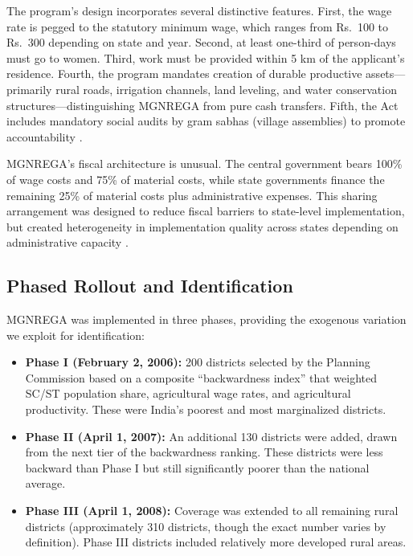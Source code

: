 \documentclass[12pt]{article}
\begin{document}
The program's design incorporates several distinctive features. First, the wage rate is pegged to the statutory minimum wage, which ranges from Rs.~100 to Rs.~300 depending on state and year. Second, at least one-third of person-days must go to women. Third, work must be provided within 5 km of the applicant's residence. Fourth, the program mandates creation of durable productive assets---primarily rural roads, irrigation channels, land leveling, and water conservation structures---distinguishing MGNREGA from pure cash transfers. Fifth, the Act includes mandatory social audits by gram sabhas (village assemblies) to promote accountability \citep{aiyar2012mnrega}.

MGNREGA's fiscal architecture is unusual. The central government bears 100\% of wage costs and 75\% of material costs, while state governments finance the remaining 25\% of material costs plus administrative expenses. This sharing arrangement was designed to reduce fiscal barriers to state-level implementation, but created heterogeneity in implementation quality across states depending on administrative capacity \citep{sukhtankar2017sweetening}.

\subsection{Phased Rollout and Identification}

MGNREGA was implemented in three phases, providing the exogenous variation we exploit for identification:

\begin{itemize}
  \item \textbf{Phase I (February 2, 2006):} 200 districts selected by the Planning Commission based on a composite ``backwardness index'' that weighted SC/ST population share, agricultural wage rates, and agricultural productivity. These were India's poorest and most marginalized districts.

  \item \textbf{Phase II (April 1, 2007):} An additional 130 districts were added, drawn from the next tier of the backwardness ranking. These districts were less backward than Phase I but still significantly poorer than the national average.

  \item \textbf{Phase III (April 1, 2008):} Coverage was extended to all remaining rural districts (approximately 310 districts, though the exact number varies by definition). Phase III districts included relatively more developed rural areas.
\end{itemize}
\end{document}
